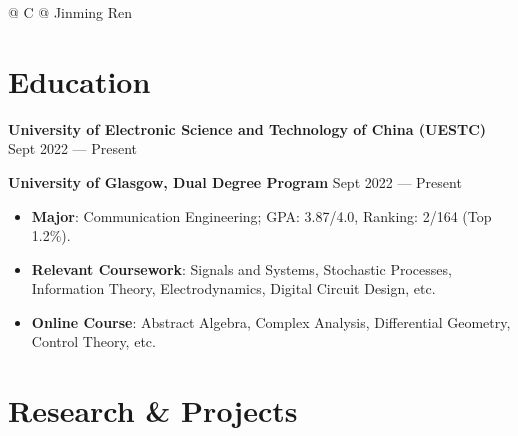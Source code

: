 \documentclass[a4paper,11pt]{article}
\begin{document}
\pagestyle{empty} 



\begin{tabularx}{\linewidth}{@{} C @{}}
\Huge{Jinming Ren} \\[7.5pt]
\end{tabularx}


\section{Education}


\textbf{University of Electronic Science and Technology of China (UESTC)}  \hfill Sept 2022 --- Present

\textbf{University of Glasgow, Dual Degree Program} \hfill Sept 2022 --- Present

\begin{itemize}
    \setlength\itemsep{-0.5em}
    \item \textbf{Major}: Communication Engineering; GPA: 3.87/4.0, Ranking: 2/164 (Top 1.2\%).
    \item \textbf{Relevant Coursework}: Signals and Systems, Stochastic Processes, Information Theory, Electrodynamics, Digital Circuit Design, etc.
    \item \textbf{Online Course}: Abstract Algebra, Complex Analysis, Differential Geometry, Control Theory, etc.
\end{itemize}


\section{Research \& Projects}
\end{document}
